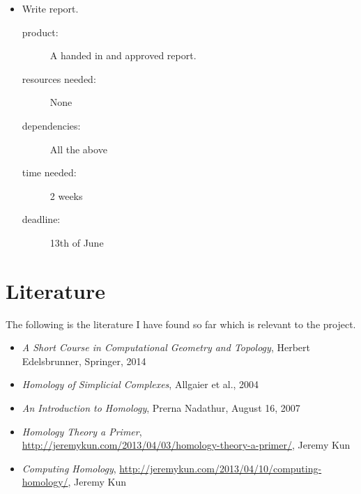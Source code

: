 \documentclass[11pt]{article}
\begin{document}
\begin{itemize}
\item Write report.
\begin{description}
\item[product:]A handed in and approved report.
\item[resources needed:]None
\item[dependencies:]All the above
\item[time needed:]2 weeks
\item[deadline:]13th of June
\end{description}
\end{itemize}

\section*{Literature}
The following is the literature I have found so far which is relevant to the project.
\begin{itemize}
\item \emph{A Short Course in Computational Geometry and Topology}, Herbert Edelsbrunner, Springer, 2014
\item \emph{Homology of Simplicial Complexes}, Allgaier et al., 2004
\item \emph{An Introduction to Homology}, Prerna Nadathur, August 16, 2007
\item \emph{Homology Theory a Primer},\\ \url{http://jeremykun.com/2013/04/03/homology-theory-a-primer/}, Jeremy Kun
\item \emph{Computing Homology}, \url{http://jeremykun.com/2013/04/10/computing-homology/}, Jeremy Kun
\end{itemize}
\end{document}
